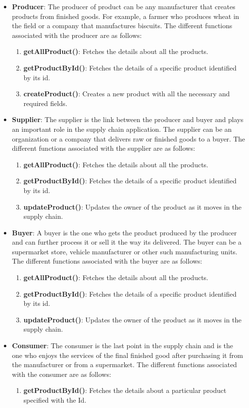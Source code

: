 \documentclass[
  a4paper,  %
  twoside,  %
  bibliography=totoc,
  headsepline,
  cleardoublepage=empty,
  parskip=half,
  draft=false
]{scrbook}
\begin{document}
\begin{itemize}
    \item \textbf{Producer}: The producer of product can be any manufacturer that creates products from finished goods. For example, a farmer who produces wheat in the field or a company that manufactures biscuits. The different functions associated with the producer are as follows:
    \begin{enumerate}
        \item \textbf{getAllProduct()}: Fetches the details about all the products.
        \item \textbf{getProductById()}: Fetches the details of a specific product identified by its id.
        \item \textbf{createProduct()}: Creates a new product with all the necessary and required fields.
    \end{enumerate}
    \item \textbf{Supplier}: The supplier is the link between the producer and buyer and plays an important role in the supply chain application. The supplier can be an organization or a company that delivers raw or finished goods to a buyer. The different functions associated with the supplier are as follows:
    \begin{enumerate}
        \item \textbf{getAllProduct()}: Fetches the details about all the products.
        \item \textbf{getProductById()}: Fetches the details of a specific product identified by its id.
        \item \textbf{updateProduct()}: Updates the owner of the product as it moves in the supply chain.
    \end{enumerate}
    \item \textbf{Buyer}: A buyer is the one who gets the product produced by the producer and can further process it or sell it the way its delivered. The buyer can be a supermarket store, vehicle manufacturer or other such manufacturing units. The different functions associated with the buyer are as follows:
    \begin{enumerate}
        \item \textbf{getAllProduct()}: Fetches the details about all the products.
        \item \textbf{getProductById()}: Fetches the details of a specific product identified by its id.
        \item \textbf{updateProduct()}: Updates the owner of the product as it moves in the supply chain.
    \end{enumerate}
    \item \textbf{Consumer}: The consumer is the last point in the supply chain and is the one who enjoys the services of the final finished good after purchasing it from the manufacturer or from a supermarket. The different functions associated with the consumer are as follows:
    \begin{enumerate}
        \item \textbf{getProductById()}: Fetches the details about a particular product specified with the Id.
    \end{enumerate}
\end{itemize}
\end{document}
